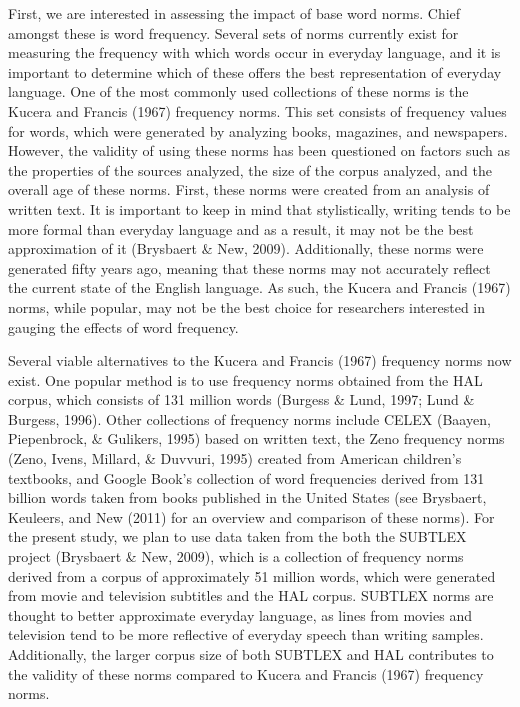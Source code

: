 \documentclass[english,man]{apa6}
\theoremstyle{definition}
\theoremstyle{definition}
\theoremstyle{definition}
\theoremstyle{remark}
\begin{document}
First, we are interested in assessing the impact of base word norms.
Chief amongst these is word frequency. Several sets of norms currently
exist for measuring the frequency with which words occur in everyday
language, and it is important to determine which of these offers the
best representation of everyday language. One of the most commonly used
collections of these norms is the Kucera and Francis (1967) frequency
norms. This set consists of frequency values for words, which were
generated by analyzing books, magazines, and newspapers. However, the
validity of using these norms has been questioned on factors such as the
properties of the sources analyzed, the size of the corpus analyzed, and
the overall age of these norms. First, these norms were created from an
analysis of written text. It is important to keep in mind that
stylistically, writing tends to be more formal than everyday language
and as a result, it may not be the best approximation of it (Brysbaert
\& New, 2009). Additionally, these norms were generated fifty years ago,
meaning that these norms may not accurately reflect the current state of
the English language. As such, the Kucera and Francis (1967) norms,
while popular, may not be the best choice for researchers interested in
gauging the effects of word frequency.

Several viable alternatives to the Kucera and Francis (1967) frequency
norms now exist. One popular method is to use frequency norms obtained
from the HAL corpus, which consists of 131 million words (Burgess \&
Lund, 1997; Lund \& Burgess, 1996). Other collections of frequency norms
include CELEX (Baayen, Piepenbrock, \& Gulikers, 1995) based on written
text, the Zeno frequency norms (Zeno, Ivens, Millard, \& Duvvuri, 1995)
created from American children's textbooks, and Google Book's collection
of word frequencies derived from 131 billion words taken from books
published in the United States (see Brysbaert, Keuleers, and New (2011)
for an overview and comparison of these norms). For the present study,
we plan to use data taken from the both the SUBTLEX project (Brysbaert
\& New, 2009), which is a collection of frequency norms derived from a
corpus of approximately 51 million words, which were generated from
movie and television subtitles and the HAL corpus. SUBTLEX norms are
thought to better approximate everyday language, as lines from movies
and television tend to be more reflective of everyday speech than
writing samples. Additionally, the larger corpus size of both SUBTLEX
and HAL contributes to the validity of these norms compared to Kucera
and Francis (1967) frequency norms.
\end{document}
